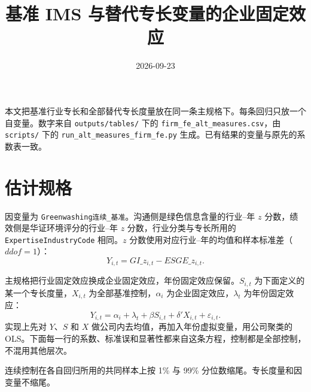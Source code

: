 \documentclass[11pt]{article}
\title{基准 IMS 与替代专长变量的企业固定效应}
\author{}
\date{2026-09-23}
\begin{document}
\maketitle

本文把基准行业专长和全部替代专长度量放在同一条主规格下。每条回归只放一个自变量。数字来自 \texttt{outputs/tables/} 下的 \texttt{firm\_fe\_alt\_measures.csv}，由 \texttt{scripts/} 下的 \texttt{run\_alt\_measures\_firm\_fe.py} 生成。已有结果的变量与原先的系数表一致。

\section{估计规格}
\label{sec:spec}

因变量为 \texttt{Greenwashing连续\_基准}。沟通侧是绿色信息含量的行业--年 \(z\) 分数，绩效侧是华证环境评分的行业--年 \(z\) 分数，行业分类与专长所用的 \texttt{ExpertiseIndustryCode} 相同。\(z\) 分数使用对应行业--年的均值和样本标准差（\(ddof=1\)）：
\[
Y_{i,t}=GI\_z_{i,t}-ESGE\_z_{i,t}.
\]

主规格把行业固定效应换成企业固定效应，年份固定效应保留。\(S_{i,t}\) 为下面定义的某一个专长度量，\(X_{i,t}\) 为全部基准控制，\(\alpha_i\) 为企业固定效应，\(\lambda_t\) 为年份固定效应：
\begin{equation}
Y_{i,t}=\alpha_i+\lambda_t+\beta S_{i,t}+\delta'X_{i,t}+\varepsilon_{i,t}.
\label{eq:firmfe}
\end{equation}
实现上先对 \(Y\)、\(S\) 和 \(X\) 做公司内去均值，再加入年份虚拟变量，用公司聚类的 OLS。下面每一行的系数、标准误和显著性都来自这条方程，控制都是全部控制，不混用其他层次。

连续控制在各自回归所用的共同样本上按 1\% 与 99\% 分位数缩尾。专长度量和因变量不缩尾。
\end{document}
